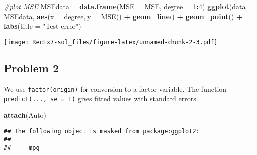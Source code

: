 \documentclass[]{article}
\newenvironment{Shaded}{\begin{snugshade}}{\end{snugshade}}
\newcommand{\KeywordTok}[1]{\textcolor[rgb]{0.13,0.29,0.53}{\textbf{#1}}}
\newcommand{\DataTypeTok}[1]{\textcolor[rgb]{0.13,0.29,0.53}{#1}}
\newcommand{\DecValTok}[1]{\textcolor[rgb]{0.00,0.00,0.81}{#1}}
\newcommand{\StringTok}[1]{\textcolor[rgb]{0.31,0.60,0.02}{#1}}
\newcommand{\CommentTok}[1]{\textcolor[rgb]{0.56,0.35,0.01}{\textit{#1}}}
\newcommand{\OperatorTok}[1]{\textcolor[rgb]{0.81,0.36,0.00}{\textbf{#1}}}
\newcommand{\NormalTok}[1]{#1}
\begin{document}
\begin{Shaded}
\begin{Highlighting}[]
\CommentTok{#plot MSE}
\NormalTok{MSEdata =}\StringTok{ }\KeywordTok{data.frame}\NormalTok{(}\DataTypeTok{MSE =}\NormalTok{ MSE, }\DataTypeTok{degree =} \DecValTok{1}\OperatorTok{:}\DecValTok{4}\NormalTok{)}
\KeywordTok{ggplot}\NormalTok{(}\DataTypeTok{data =}\NormalTok{ MSEdata, }\KeywordTok{aes}\NormalTok{(}\DataTypeTok{x =}\NormalTok{ degree, }\DataTypeTok{y =}\NormalTok{ MSE)) }\OperatorTok{+}\StringTok{ }\KeywordTok{geom_line}\NormalTok{() }\OperatorTok{+}\StringTok{ }
\StringTok{  }\KeywordTok{geom_point}\NormalTok{() }\OperatorTok{+}\StringTok{ }\KeywordTok{labs}\NormalTok{(}\DataTypeTok{title =} \StringTok{"Test error"}\NormalTok{)}
\end{Highlighting}
\end{Shaded}

\texttt{[image: RecEx7-sol\_files/figure-latex/unnamed-chunk-2-3.pdf]}

\subsection{Problem 2}\label{problem-2}

We use \texttt{factor(origin)} for conversion to a factor variable. The
function \texttt{predict(...,\ se\ =\ T)} gives fitted values with
standard errors.

\begin{Shaded}
\begin{Highlighting}[]
\KeywordTok{attach}\NormalTok{(Auto)}
\end{Highlighting}
\end{Shaded}

\begin{verbatim}
## The following object is masked from package:ggplot2:
## 
##     mpg
\end{verbatim}
\end{document}
